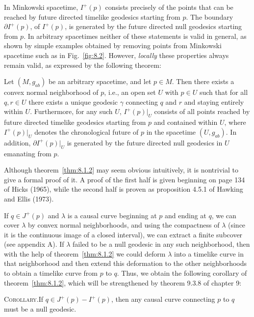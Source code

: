In Minkowski spacetime, \(I^+(p)\) consists precisely of the points that can be
reached by future directed timelike geodesics starting from \(p\). The boundary
\(\partial I^+(p)\), of \(I^+(p)\), is generated by the future directed null geodesics
starting from \(p\). In arbitrary spacetimes neither of these statements is valid in
general, as shown by simple examples obtained by removing points from Minkowski
spacetime such as in Fig.~\ref{fig:8.2}. However, \emph{locally} these properties
always remain valid, as expressed by the following theorem:



\begin{theorem}\label{thm:8.1.2}
Let \((M,g_{ab})\) be an arbitrary spacetime, and let \(p\in M\). Then there
exists a convex normal neighborhood of \(p\), i.e., an open set \(U\) with
\(p\in U\) such that for all \(q,r\in U\) there exists a unique geodesic \(\gamma\)
connecting \(q\) and \(r\) and staying entirely within \(U\). Furthermore, for any
such \(U\), \(I^+(p)|_U\) consists of all points reached by future directed timelike
geodesics starting from \(p\) and contained within \(U\), where \(I^+(p)|_U\)
denotes the chronological future of \(p\) in the spacetime \((U,g_{ab})\). In
addition, \(\partial I^+(p)|_U\) is generated by the future directed null geodesics
in \(U\) emanating from \(p\).
\end{theorem}

Although theorem~\ref{thm:8.1.2} may seem obvious intuitively, it is nontrivial to
give a formal proof of it. A proof of the first half is given beginning on page 134 of
Hicks (1965), while the second half is proven as proposition 4.5.1 of Hawking and
Ellis (1973).

If \(q\in J^+(p)\) and \(\lambda\) is a causal curve beginning at \(p\) and ending
at \(q\), we can cover \(\lambda\) by convex normal neighborhoods, and using the
compactness of \(\lambda\) (since it is the continuous image of a closed interval),
we can extract a finite subcover (see appendix A). If \(\lambda\) failed to be a null
geodesic in any such neighborhood, then with the help of theorem~\ref{thm:8.1.2}
we could deform \(\lambda\) into a timelike curve in that neighborhood and then
extend this deformation to the other neighborhoods to obtain a timelike curve from
\(p\) to \(q\). Thus, we obtain the following corollary of theorem~\ref{thm:8.1.2},
which will be strengthened by theorem 9.3.8 of chapter 9:

\medskip
\noindent\textsc{Corollary.}\quad If \(q\in J^+(p)-I^+(p)\), then any causal
curve connecting \(p\) to \(q\) must be a null geodesic.
\medskip

